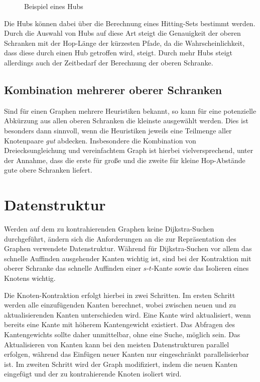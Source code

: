 \begin{figure}[h!]
  \centering

  \caption{Beispiel eines Hubs}
\end{figure}

Die Hubs können dabei über die Berechnung eines Hitting-Sets bestimmt werden.
Durch die Auswahl von Hubs auf diese Art steigt die Genauigkeit der oberen Schranken mit der Hop-Länge der kürzesten Pfade, da die Wahrscheinlichkeit, dass diese durch einen Hub getroffen wird, steigt.
Durch mehr Hubs steigt allerdings auch der Zeitbedarf der Berechnung der oberen Schranke.

\subsection{Kombination mehrerer oberer Schranken}
Sind für einen Graphen mehrere Heuristiken bekannt, so kann für eine potenzielle Abkürzung aus allen oberen Schranken die kleinste ausgewählt werden.
Dies ist besonders dann sinnvoll, wenn die Heuristiken jeweils eine Teilmenge aller Knotenpaare \emph{gut} abdecken.
Insbesondere die Kombination von Dreiecksungleichung und vereinfachtem Graph ist hierbei vielversprechend, unter der Annahme, dass die erste für große und die zweite für kleine Hop-Abstände gute obere Schranken liefert.

\section{Datenstruktur}

Werden auf dem zu kontrahierenden Graphen keine Dijkstra-Suchen durchgeführt, ändern sich die Anforderungen an die zur Repräsentation des Graphen verwendete Datenstruktur.
Während für Dijkstra-Suchen vor allem das schnelle Auffinden ausgehender Kanten wichtig ist, sind bei der Kontraktion mit oberer Schranke das schnelle Auffinden einer $s$-$t$-Kante sowie das Isolieren eines Knotens wichtig.

Die Knoten-Kontraktion erfolgt hierbei in zwei Schritten.
Im ersten Schritt werden alle einzufügenden Kanten berechnet, wobei zwischen neuen und zu aktualisierenden Kanten unterschieden wird.
Eine Kante wird aktualisiert, wenn bereits eine Kante mit höherem Kantengewicht existiert.
Das Abfragen des Kantengewichts sollte daher unmittelbar, ohne eine Suche, möglich sein.
Das Aktualisieren von Kanten kann bei den meisten Datenstrukturen parallel erfolgen, während das Einfügen neuer Kanten nur eingeschränkt parallelisierbar ist.
Im zweiten Schritt wird der Graph modifiziert, indem die neuen Kanten eingefügt und der zu kontrahierende Knoten isoliert wird.

